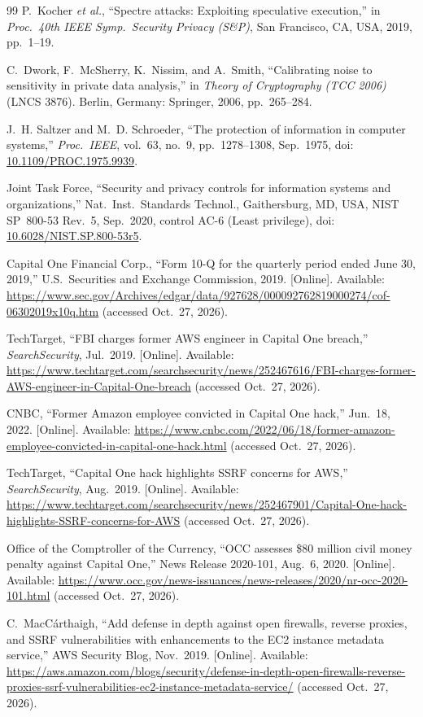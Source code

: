 \documentclass[11pt,a4paper]{article}
\begin{document}
\begin{thebibliography}{99}
P.~Kocher \emph{et al.}, ``Spectre attacks: Exploiting speculative execution,'' in \emph{Proc.\ 40th IEEE Symp.\ Security Privacy (S\&P)}, San Francisco, CA, USA, 2019, pp.~1--19.

C.~Dwork, F.~McSherry, K.~Nissim, and A.~Smith, ``Calibrating noise to sensitivity in private data analysis,'' in \emph{Theory of Cryptography (TCC 2006)} (LNCS 3876). Berlin, Germany: Springer, 2006, pp.~265--284.

J.~H. Saltzer and M.~D. Schroeder, ``The protection of information in computer systems,'' \emph{Proc.\ IEEE}, vol.~63, no.~9, pp.~1278--1308, Sep.~1975, doi: \href{https://doi.org/10.1109/PROC.1975.9939}{10.1109/PROC.1975.9939}.

Joint Task Force, ``Security and privacy controls for information systems and organizations,'' Nat.\ Inst.\ Standards Technol., Gaithersburg, MD, USA, NIST SP~800-53 Rev.~5, Sep.~2020, control AC-6 (Least privilege), doi: \href{https://doi.org/10.6028/NIST.SP.800-53r5}{10.6028/NIST.SP.800-53r5}.

Capital One Financial Corp., ``Form 10-Q for the quarterly period ended June 30, 2019,'' U.S.\ Securities and Exchange Commission, 2019. [Online]. Available: \url{https://www.sec.gov/Archives/edgar/data/927628/000092762819000274/cof-06302019x10q.htm} (accessed Oct.~27, 2026).

TechTarget, ``FBI charges former AWS engineer in Capital One breach,'' \emph{SearchSecurity}, Jul.~2019. [Online]. Available: \url{https://www.techtarget.com/searchsecurity/news/252467616/FBI-charges-former-AWS-engineer-in-Capital-One-breach} (accessed Oct.~27, 2026).

CNBC, ``Former Amazon employee convicted in Capital One hack,'' Jun.~18, 2022. [Online]. Available: \url{https://www.cnbc.com/2022/06/18/former-amazon-employee-convicted-in-capital-one-hack.html} (accessed Oct.~27, 2026).

TechTarget, ``Capital One hack highlights SSRF concerns for AWS,'' \emph{SearchSecurity}, Aug.~2019. [Online]. Available: \url{https://www.techtarget.com/searchsecurity/news/252467901/Capital-One-hack-highlights-SSRF-concerns-for-AWS} (accessed Oct.~27, 2026).

Office of the Comptroller of the Currency, ``OCC assesses \$80 million civil money penalty against Capital One,'' News Release 2020-101, Aug.~6, 2020. [Online]. Available: \url{https://www.occ.gov/news-issuances/news-releases/2020/nr-occ-2020-101.html} (accessed Oct.~27, 2026).

C.~MacC\'arthaigh, ``Add defense in depth against open firewalls, reverse proxies, and SSRF vulnerabilities with enhancements to the EC2 instance metadata service,'' AWS Security Blog, Nov.~2019. [Online]. Available: \url{https://aws.amazon.com/blogs/security/defense-in-depth-open-firewalls-reverse-proxies-ssrf-vulnerabilities-ec2-instance-metadata-service/} (accessed Oct.~27, 2026).
\end{thebibliography}
\end{document}
